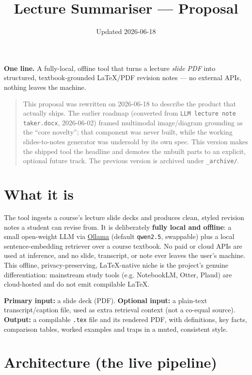 \documentclass[11pt,a4paper]{article}
\title{\vspace{-1.5cm}\textbf{Lecture Summariser --- Proposal}}
\author{}
\date{Updated 2026-06-18}
\begin{document}
\maketitle
\vspace{-1.2em}

\noindent\textbf{One line.} A fully-local, offline tool that turns a lecture \emph{slide PDF} into
structured, textbook-grounded \LaTeX/PDF revision notes --- no external APIs, nothing leaves the machine.

\begin{quote}\small
This proposal was rewritten on 2026-06-18 to describe the product that actually ships. The earlier
roadmap (converted from \texttt{LLM lecture note taker.docx}, 2026-06-02) framed multimodal image/diagram
grounding as the ``core novelty''; that component was never built, while the working slides-to-notes
generator was undersold by its own spec. This version makes the shipped tool the headline and demotes the
unbuilt parts to an explicit, optional future track. The previous version is archived under
\texttt{\_archive/}.
\end{quote}

\section{What it is}

The tool ingests a course's lecture slide decks and produces clean, styled revision notes a student can
revise from. It is deliberately \textbf{fully local and offline}: a small open-weight LLM via
\href{https://ollama.com}{Ollama} (default \texttt{qwen2.5}, swappable) plus a local sentence-embedding
retriever over a course textbook. No paid or cloud APIs are used at inference, and no slide, transcript, or
note ever leaves the user's machine. This offline, privacy-preserving, \LaTeX-native niche is the project's
genuine differentiation: mainstream study tools (e.g. NotebookLM, Otter, Plaud) are cloud-hosted and do not
emit compilable \LaTeX.

\textbf{Primary input:} a slide deck (PDF). \textbf{Optional input:} a plain-text transcript/caption file,
used as extra retrieval context (not a co-equal source). \textbf{Output:} a compilable \texttt{.tex} file
and its rendered PDF, with definitions, key facts, comparison tables, worked examples and traps in a muted,
consistent style.

\section{Architecture (the live pipeline)}
\end{document}
